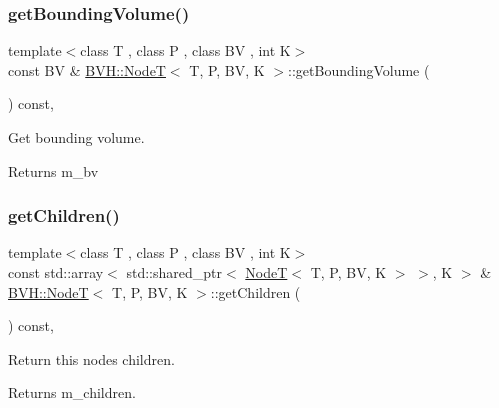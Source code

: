 \subsubsection{\texorpdfstring{get\+Bounding\+Volume()}{getBoundingVolume()}}
{\footnotesize\ttfamily template$<$class T , class P , class BV , int K$>$ \\
const BV \& \hyperlink{classBVH_1_1NodeT}{B\+V\+H\+::\+NodeT}$<$ T, P, BV, K $>$\+::get\+Bounding\+Volume (\begin{DoxyParamCaption}{ }\end{DoxyParamCaption}) const\hspace{0.3cm}{\ttfamily [inline]}, {\ttfamily [noexcept]}}



Get bounding volume. 

\begin{DoxyReturn}{Returns}
m\+\_\+bv 
\end{DoxyReturn}
\mbox{\label{classBVH_1_1NodeT_ac8df9e7b154186207263b8727e1084a8}} 
\subsubsection{\texorpdfstring{get\+Children()}{getChildren()}}
{\footnotesize\ttfamily template$<$class T , class P , class BV , int K$>$ \\
const std\+::array$<$ std\+::shared\+\_\+ptr$<$ \hyperlink{classBVH_1_1NodeT}{NodeT}$<$ T, P, BV, K $>$ $>$, K $>$ \& \hyperlink{classBVH_1_1NodeT}{B\+V\+H\+::\+NodeT}$<$ T, P, BV, K $>$\+::get\+Children (\begin{DoxyParamCaption}{ }\end{DoxyParamCaption}) const\hspace{0.3cm}{\ttfamily [inline]}, {\ttfamily [noexcept]}}



Return this node\textquotesingle{}s children. 

\begin{DoxyReturn}{Returns}
m\+\_\+children. 
\end{DoxyReturn}
\mbox{\label{classBVH_1_1NodeT_a8da9f78078b0a579868d026bd61a2947}} 
